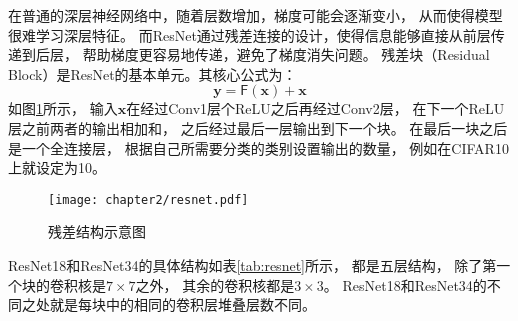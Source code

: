 在普通的深层神经网络中，随着层数增加，梯度可能会逐渐变小，
从而使得模型很难学习深层特征。
而ResNet通过残差连接的设计，使得信息能够直接从前层传递到后层，
帮助梯度更容易地传递，避免了梯度消失问题。
残差块（Residual Block）是ResNet的基本单元。其核心公式为：
\begin{equation}
    \mathbf{y} = \mathsf{F}(\mathbf{x}) + \mathbf{x}
\end{equation}
如图\ref{fig:2-2-2-resnet}所示，
输入$\mathbf{x}$在经过Conv1层个ReLU之后再经过Conv2层，
在下一个ReLU层之前两者的输出相加和，
之后经过最后一层输出到下一个块。
在最后一块之后是一个全连接层，
根据自己所需要分类的类别设置输出的数量，
例如在CIFAR10上就设定为10。
\begin{figure}[H]
    \centering
    \texttt{[image: chapter2/resnet.pdf]}
    \caption{\label{fig:2-2-2-resnet}残差结构示意图}
\end{figure}

ResNet18和ResNet34的具体结构如表\ref{tab:resnet}所示，
都是五层结构，
除了第一个块的卷积核是$7 \times 7$之外，
其余的卷积核都是$3 \times 3$。
ResNet18和ResNet34的不同之处就是每块中的相同的卷积层堆叠层数不同。



